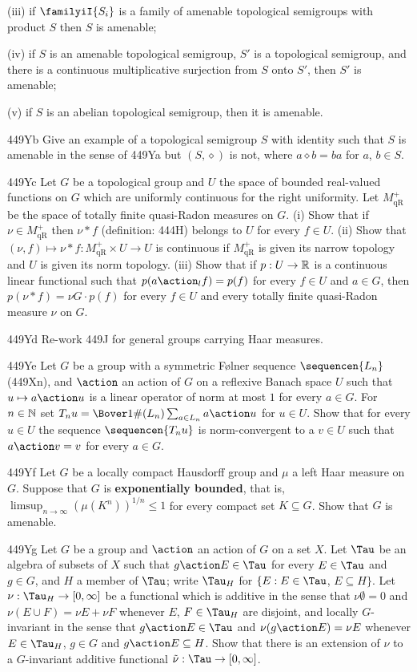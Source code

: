 {\quad(iii) if $\familyiI{S_i}$ is a family of amenable topological
semigroups with product $S$ then $S$ is amenable;

\quad(iv) if $S$ is an amenable topological semigroup, $S'$ is a
topological
semigroup, and there is a continuous multiplicative surjection from
$S$ onto $S'$, then $S'$ is amenable;

\quad(v) if $S$ is an abelian topological semigroup, then it is
amenable.

\spheader 449Yb Give an example of a topological semigroup  $S$ with
identity such that $S$ is amenable
in the sense of 449Ya but $(S,\diamond)$ is not, where $a\diamond b=ba$
for $a$, $b\in S$.

\spheader 449Yc Let $G$ be a topological group and $U$ the space of
bounded real-valued functions on $G$ which are uniformly
continuous for the right uniformity.   Let $M_{\text{qR}}^+$ be the
space of totally finite quasi-Radon measures on $G$.   (i) Show that if
$\nu\in M_{\text{qR}}^+$ then $\nu*f$ (definition:
444H) belongs to $U$ for every $f\in U$.
(ii) Show that $(\nu,f)\mapsto\nu*f:M_{\text{qR}}^+\times U\to U$ is
continuous if $M_{\text{qR}}^+$ is given its narrow topology and $U$ is
given its norm topology.   (iii) Show that if
$p:U\to\Bbb R$ is a continuous linear functional such that
$p(a\action_lf)=p(f)$ for every $f\in U$ and $a\in G$, then
$p(\nu*f)=\nu G\cdot p(f)$ for every $f\in U$ and every totally finite
quasi-Radon measure $\nu$ on $G$.

\spheader 449Yd Re-work 449J for general groups carrying Haar
measures.

\spheader 449Ye Let $G$ be a group with a symmetric F{\o}lner sequence
$\sequencen{L_n}$ (449Xn), and $\action$ an action of $G$ on a reflexive
Banach space $U$ such that $u\mapsto a\action u$ is a linear operator of
norm at most $1$ for every $a\in G$.   For $n\in\Bbb N$ set
$T_nu=\Bover1{\#(L_n)}\sum_{a\in L_n}a\action u$ for $u\in U$.
Show that
for every $u\in U$ the sequence $\sequencen{T_nu}$ is norm-convergent
to a $v\in U$ such that $a\action v=v$ for every $a\in G$.   

\spheader 449Yf
Let $G$ be a locally compact Hausdorff group and
$\mu$ a left Haar measure on $G$.   Suppose that $G$ is {\bf exponentially
bounded}, that is,
$\limsup_{n\to\infty}(\mu(K^n))^{1/n}\le 1$ for every compact set
$K\subseteq G$.    Show that $G$ is amenable.

\spheader 449Yg Let
$G$ be a group and $\action$ an action of $G$ on a set
$X$.   Let $\Tau$ be an algebra of subsets of $X$ such that
$g\action E\in\Tau$ for every $E\in\Tau$ and $g\in G$, and $H$ a member
of $\Tau$;   write $\Tau_H$ for $\{E:E\in\Tau$, $E\subseteq H\}$.
Let $\nu:\Tau_H\to[0,\infty]$ be
a functional which is additive in the sense that $\nu\emptyset=0$ and
$\nu(E\cup F)=\nu E+\nu F$ whenever $E$, $F\in\Tau_H$ are disjoint,
and locally $G$-invariant in the sense that $g\action E\in\Tau$ and
$\nu(g\action E)=\nu E$ whenever $E\in\Tau_H$, $g\in G$ and
$g\action E\subseteq H$.   Show that
there is an extension of $\nu$ to a $G$-invariant additive functional
$\tilde\nu:\Tau\to[0,\infty]$.

}
